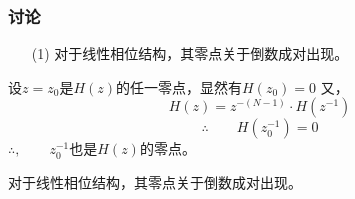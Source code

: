 \documentclass[notheorems,compress,mathserif,table]{beamer}
\begin{document}
\begin{frame}[shrink]\frametitle{讨论}%
\begin{enumerate}
  \item [(1)] 对于线性相位结构，其零点关于倒数成对出现。
\end{enumerate}
设$z=z_0$是$H(z)$的任一零点，显然有$H(z_0)=0$
又，
$$H(z) = z^{-(N-1)}\cdot H(z^{-1})$$
$$\therefore\quad\quad H(z_0^{-1})=0$$
$\therefore,\quad\quad z_0^{-1}$也是$H(z)$的零点。

对于线性相位结构，其零点关于倒数成对出现。
\end{frame}
\end{document}
